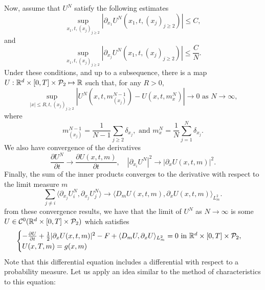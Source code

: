 Now, assume that $U^N$ satisfy the following estimates
\begin{equation}
    \sup_{x_1, t, {(x_j)}_{j \geq 2}} \left| \partial_{x_1} U^N (x_1, t, {(x_j)}_{j \geq 2}) \right| \leq C,
\end{equation}
and
\begin{equation}
    \sup_{x_1, t, {(x_j)}_{j \geq 2}} \left| \partial_{x_j} U^N (x_1, t, {(x_j)}_{j \geq 2}) \right| \leq  \frac{C}{N}.
\end{equation}
Under these conditions, and up to a subsequence, there is a map 
$U : \mathbb{R}^d \times [0,T] \times \mathcal{P}_2 \mapsto \mathbb{R}$ such that,
for any $R > 0$,
\begin{equation}
    \sup_{|x| \leq R, t, {(x_j)}_{j\geq 2}} | U^N(x,t,m^{N-1}_{(x_j)}) - U(x,t,m^N_x) | \to 0\text{ as } N \to \infty,
\end{equation}
where
\begin{equation}
    m^{N-1}_{(x_j)} = \frac{1}{N-1} \sum_{j \geq 2} \delta_{x_j}, \text{ and } m^N_x = \frac{1}{N} \sum_{j = 1}^N \delta_{x_j}.
\end{equation}
We also have convergence of the derivatives
\begin{equation}
    \frac{\partial U^N}{\partial t} \to \frac{\partial U(x,t,m)}{\partial t}, \quad |\partial_{x_i} U^N|^2 \to |\partial_x U (x,t,m)|^2.
\end{equation}
Finally, the sum of the inner products converges to the derivative with respect to the limit measure $m$
\begin{equation}
    \sum_{j\neq i} \langle \partial_{x_j} U^N_i , \partial_{x_j} U^N_j \rangle \to \langle D_m U(x,t,m), \partial_x U(x, t, m) \rangle_{L^2_m}.
\end{equation}
from these convergence results, we have that the limit of $U^N$ as $N \to \infty$
is some $U\in \mathcal{C}^0(\mathbb{R}^d \times [0,T] \times \mathcal{P}_2) $
 which satisfies 
 \begin{equation}\label{wass:simple_master_equation}
    \begin{cases}
        - \frac{\partial U}{ \partial t} + \frac{1}{2} |\partial_x U(x,t,m)|^2 - F + \langle D_m U, \partial_x U \rangle_{L^2_m} = 0\text{ in }\mathbb{R}^d \times [0,T] \times \mathcal{P}_2,\\
        U(x,T,m) = g(x,m)
    \end{cases}
 \end{equation}
 Note that this differential equation includes a differential with respect to
 a probability measure.
  Let us apply an idea similar to the method of characteristics to this equation:
